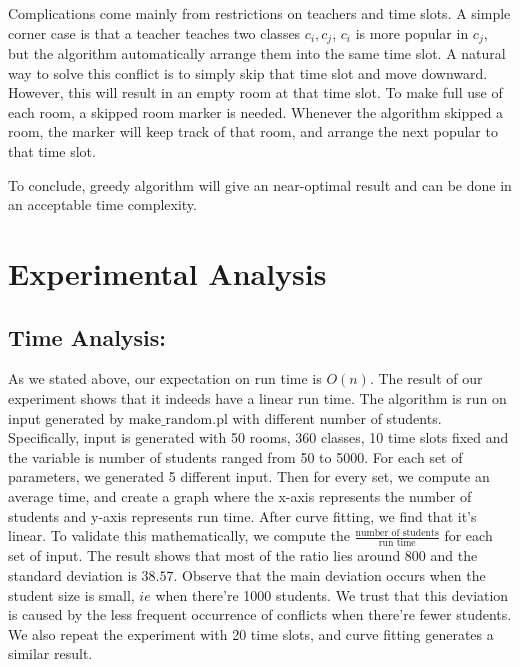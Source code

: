 \documentclass[11pt, oneside]{article}   	%
\begin{document}
\par Complications come mainly from restrictions on teachers and time slots. A simple corner case is that a teacher teaches two classes $c_i,c_j$, $c_i$ is more popular in $c_j$, but the algorithm automatically arrange them into the same time slot. A natural way to solve this conflict is to simply skip that time slot and move downward. However, this will result in an empty room at that time slot. To make full use of each room, a skipped room marker is needed. Whenever the algorithm skipped a room, the marker will keep track of that room, and arrange the next popular to that time slot.
\par To conclude, greedy algorithm will give an near-optimal result and can be done in an acceptable time complexity.
 
 \section{Experimental Analysis}
 \subsection{Time Analysis:}
As we stated above, our expectation on run time is $O(n)$. The result of our experiment shows that it indeeds have a linear run time. The algorithm is run on input generated by $\text{make\_random.pl}$ with different number of students. Specifically, input is generated with 50 rooms, 360 classes, 10 time 
slots fixed and the variable is number of students ranged from 50 to 5000. For each set of parameters, we generated 5 different input. Then for every set, we compute an average time, and create a graph where the x-axis represents the number of students and y-axis represents run time. After curve fitting, we find that it's linear. To validate this mathematically, we compute the $\frac{\text{number of students}}{\text{run time}}$ for each set of input. The result shows that most of the ratio lies around $800$ and the standard deviation is $38.57$. Observe that the main deviation occurs when the student size is small, $ie$ when there're 1000 students. We trust that this deviation is caused by the less frequent occurrence  of conflicts when there're fewer students. We also repeat the experiment with 20 time slots, and curve fitting generates a similar result.
\end{document}
